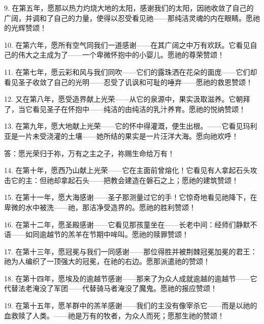 9. 在第五年，愿那以热力灼烧大地的太阳，感谢我们的太阳，因祂收敛了自己的广阔，并调和了自己的力量，使得以忍受看见祂——那纯洁灵魂的内在眼睛。愿祂的光辉赞颂！\par

10. 在第六年，愿所有空气同我们一道感谢——在其广阔之中万有欢跃。它看见自己的伟大之主成为了——一个卑微怀抱中的小婴儿。愿祂的尊荣赞颂！\par

11. 在第七年，愿云彩和风与我们同吹——它们的露珠洒在花朵的面庞——它们却看见圣子收敛了自己的光明——忍受了讥讽和可耻的唾弃——愿祂的救恩赞颂！\par

12. 又在第八年，愿受造界献上光荣——从它的泉源中，果实汲取滋养。它朝拜了，当它看见圣子在怀抱中——纯洁的由纯洁的乳汁养育。愿祂的悦纳赞颂！\par

13. 在第九年，愿大地献上光荣——它的怀中得灌溉，便生出根。——它看见玛利亚是一片未受浇灌的土壤——她所结的果实是一片汪洋大海。愿向祂欢呼！\par

答：愿光荣归于祢，万有之主之子，祢赐生命给万有！\par

14. 在第十年，愿西乃山献上光荣——它在主面前曾熔化！它看见有人拿起石头攻击它的主：但祂却拿起石头——把教会建造在磐石之上；愿祂的建筑赞颂！\par

15. 在第十一年，愿大海感谢——圣子那测量过它的手！它惊奇地看见祂降下，在卑微的水中被洗——祂，那洁净受造界的。愿祂的胜利赞颂！\par

16. 在第十二年，愿圣殿感谢——它看见那孩童坐在——长老中间：经师们静默不语——如同逾越节的羔羊在节期中哞叫。愿祂的赎罪赞颂！\par

17. 在第十三年，愿冠冕与我们一同感谢——那位得胜并被荆棘冠冕加冕的君王：祂为人编织了一顶强大的冠冕，在祂的右边。愿那派遣祂的赞颂！\par

18. 在第十四年，愿埃及的逾越节感谢——那来了为众人成就逾越的逾越节——它代替法老淹没了军团——代替骑马者淹没了魔鬼。愿祂的报应赞颂！\par

19. 在第十五年，愿羊群中的羔羊感谢——我们的主没有像宰杀它——而是以祂的血救赎了人类。——祂是万有的牧者，为众人而死；愿那生祂的赞颂！\par

